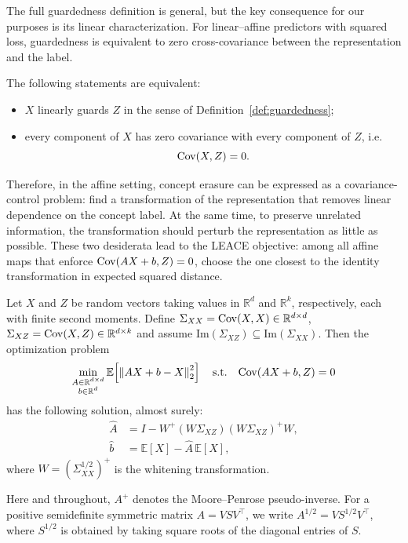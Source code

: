 The full guardedness definition is general, but the key consequence for our purposes is its linear characterization. 
For linear--affine predictors with squared loss, guardedness is equivalent to zero cross-covariance between the representation and the label.

\begin{theorem}
\label{thm:linear_guardedness}
The following statements are equivalent:
\begin{itemize}
    \item $X$ linearly guards $Z$ in the sense of Definition~\ref{def:guardedness};
    \item every component of $X$ has zero covariance with every component of $Z$, i.e.
    \[
        \mathrm{Cov}(X,Z)=0.
    \]
\end{itemize}
\end{theorem}

Therefore, in the affine setting, concept erasure can be expressed as a covariance-control problem: find a transformation of the representation that removes linear dependence on the concept label. 
At the same time, to preserve unrelated information, the transformation should perturb the representation as little as possible. 
These two desiderata lead to the LEACE objective: among all affine maps that enforce $\mathrm{Cov}(AX+b,Z)=0$, choose the one closest to the identity transformation in expected squared distance.

\begin{theorem}
\label{thm:belrose}
Let $X$ and $Z$ be random vectors taking values in $\mathbb R^d$ and $\mathbb R^k$, respectively, each with finite second moments. 
Define $\Sigma_{XX}=\mathrm{Cov}(X,X)\in\mathbb R^{d\times d}$, $\Sigma_{XZ}=\mathrm{Cov}(X,Z)\in\mathbb R^{d\times k}$
and assume $\mathrm{Im}(\Sigma_{XZ})\subseteq\mathrm{Im}(\Sigma_{XX})$. 
Then the optimization problem
\begin{equation}
\label{eq:belrose_minimization}
    \min_{\substack{A\in\mathbb R^{d\times d}\\ b\in\mathbb R^d}}
    \mathbb E\!\left[
        \left\|AX+b-X\right\|_2^2
    \right]
    \quad
    \text{s.t.}
    \quad
    \mathrm{Cov}(AX+b,Z)=0
\end{equation}
has the following solution, almost surely:
\begin{align}
    \widehat A
    &=
    I - W^+(W\Sigma_{XZ})(W\Sigma_{XZ})^+W,
    \label{eq:belrose_optimum_A}
    \\
    \widehat b
    &=
    \mathbb E[X] - \widehat A\,\mathbb E[X],
    \label{eq:belrose_optimum_b}
\end{align}
where $W=(\Sigma_{XX}^{1/2})^+$ is the whitening transformation.
\end{theorem}

Here and throughout, $A^+$ denotes the Moore--Penrose pseudo-inverse. 
For a positive semidefinite symmetric matrix $A=VSV^\top$, we write
$A^{1/2}=VS^{1/2}V^\top$, where $S^{1/2}$ is obtained by taking square roots of the diagonal entries of $S$.